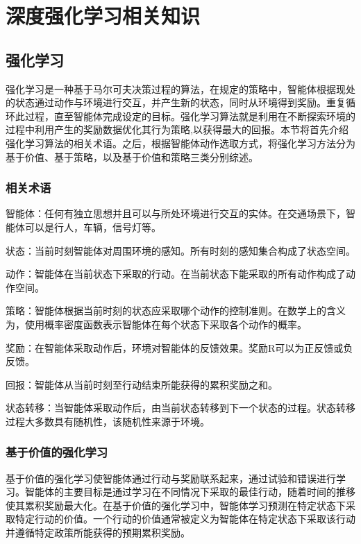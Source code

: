 \chapter{深度强化学习相关知识}
\label{chp:initialization}

\section{强化学习}

强化学习是一种基于马尔可夫决策过程的算法，在规定的策略中，智能体根据现处的状态通过动作与环境进行交互，并产生新的状态，同时从环境得到奖励。重复循环此过程，直至智能体完成设定的目标\cite{JSYJ201008008}。强化学习算法就是利用在不断探索环境的过程中利用产生的奖励数据优化其行为策略,以获得最大的回报。本节将首先介绍强化学习算法的相关术语。之后，根据智能体动作选取方式，将强化学习方法分为基于价值、基于策略，以及基于价值和策略三类分别综述。
\subsection{相关术语}
智能体：任何有独立思想并且可以与所处环境进行交互的实体。在交通场景下，智能体可以是行人，车辆，信号灯等。

状态：当前时刻智能体对周围环境的感知。所有时刻的感知集合构成了状态空间。

动作：智能体在当前状态下采取的行动。在当前状态下能采取的所有动作构成了动作空间。

策略：智能体根据当前时刻的状态应采取哪个动作的控制准则。在数学上的含义为，使用概率密度函数表示智能体在每个状态下采取各个动作的概率。

奖励：在智能体采取动作后，环境对智能体的反馈效果。奖励R可以为正反馈或负反馈。

回报：智能体从当前时刻至行动结束所能获得的累积奖励之和。

状态转移\cite{MOTO200401010}：当智能体采取动作后，由当前状态转移到下一个状态的过程。状态转移过程大多数具有随机性，该随机性来源于环境。
\subsection{基于价值的强化学习}

基于价值的强化学习使智能体通过行动与奖励联系起来，通过试验和错误进行学习。智能体的主要目标是通过学习在不同情况下采取的最佳行动，随着时间的推移使其累积奖励最大化。在基于价值的强化学习中，智能体学习预测在特定状态下采取特定行动的价值。一个行动的价值通常被定义为智能体在特定状态下采取该行动并遵循特定政策所能获得的预期累积奖励。

